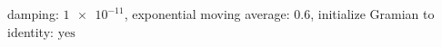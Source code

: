 damping: $\num[scientific-notation=true]{1e-11}$, exponential moving average: $\num[scientific-notation=true]{0.6}$, initialize Gramian to identity: $\text{yes}$